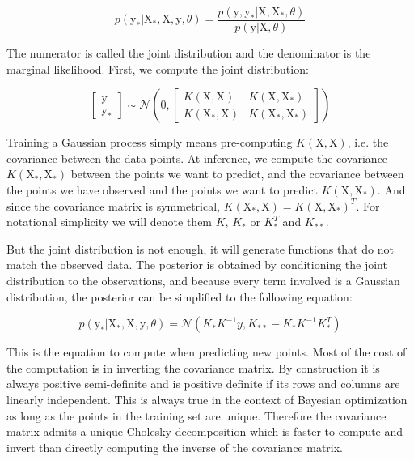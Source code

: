\begin{equation}
    p\left( \mathrm{y_*} | \mathrm{X_*}, \mathrm{X}, \mathrm{y}, \theta \right)
    =
    \frac{p\left( \mathrm{y}, \mathrm{y_*} | \mathrm{X}, \mathrm{X_*}, \theta \right)}{p\left( \mathrm{y} | \mathrm{X}, \theta \right)}
\end{equation}

The numerator is called the joint distribution and the denominator is the marginal likelihood. First, we compute the joint distribution:

\begin{equation}
    \begin{bmatrix}
    \mathrm{y} \\
    \mathrm{y_*}
    \end{bmatrix}
    \sim
    \mathcal{N} \left( 0, 
    \begin{bmatrix}
    K(\mathrm{X}, \mathrm{X}) & K(\mathrm{X}, \mathrm{X_*}) \\
    K(\mathrm{X_*}, \mathrm{X}) & K(\mathrm{X_*}, \mathrm{X_*})
    \end{bmatrix}
    \right)
\end{equation}

Training a Gaussian process simply means pre-computing $K(\mathrm{X}, \mathrm{X})$, i.e. the covariance between the data points. At inference, we compute the covariance $K(\mathrm{X_*}, \mathrm{X_*})$ between the points we want to predict, and the covariance between the points we have observed and the points we want to predict $K(\mathrm{X}, \mathrm{X_*})$. And since the covariance matrix is symmetrical, $K(\mathrm{X_*}, \mathrm{X}) = K(\mathrm{X}, \mathrm{X_*})^T$. For notational simplicity we will denote them $K$, $K_*$ or $K_*^T$ and $K_{**}$.

But the joint distribution is not enough, it will generate functions that do not match the observed data. The posterior is obtained by conditioning the joint distribution to the observations, and because every term involved is a Gaussian distribution, the posterior can be simplified to the following equation:

\begin{equation}
    p\left( \mathrm{y_*} | \mathrm{X_*}, \mathrm{X}, \mathrm{y}, \theta \right)
    =
    \mathcal{N} \left( K_* K^{-1} y, 
    K_{**} - K_* K^{-1} K_*^T \right)
\end{equation}

This is the equation to compute when predicting new points. Most of the cost of the computation is in inverting the covariance matrix. By construction it is always positive semi-definite and is positive definite if its rows and columns are linearly independent. This is always true in the context of Bayesian optimization as long as the points in the training set are unique. Therefore the covariance matrix admits a unique Cholesky decomposition which is faster to compute and invert than directly computing the inverse of the covariance matrix. 

